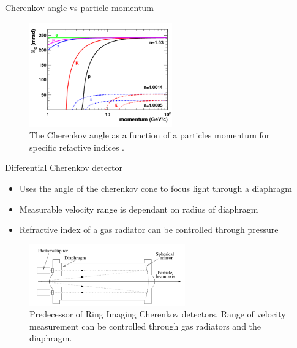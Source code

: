 \documentclass[aspectratio=1610, 10pt]{beamer}
\begin{document}
\begin{frame}{Cherenkov angle vs particle momentum}
  \begin{figure}
    \includegraphics[width=0.55\textwidth]{images/angle_momentum.png}
    \caption{The Cherenkov angle as a function of a particles momentum for specific refactive indices \cite{hep}.}
  \end{figure}
\end{frame}

\begin{frame}{Differential Cherenkov detector}
  \begin{itemize}
    \item Uses the angle of the cherenkov cone to focus light through a diaphragm
    \medskip
    \item Measurable velocity range is dependant on radius of diaphragm
    \medskip
    \item Refractive index of a gas radiator can be controlled through pressure
  \end{itemize}
    \begin{figure}
      \includegraphics[width=0.6\textwidth]{images/differential.png}
      \caption{Predecessor of Ring Imaging Cherenkov detectors. Range of velocity measurement can be controlled through
      gas radiators and the diaphragm.}
    \end{figure}
\end{frame}
\end{document}
